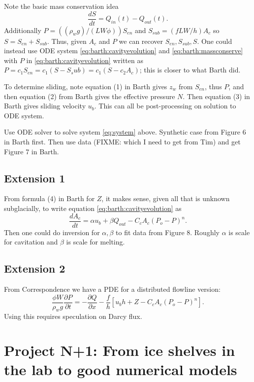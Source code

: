 \documentclass[11pt,final]{amsart}%
\begin{document}
Note the basic mass conservation idea
\begin{equation}
\frac{dS}{dt} = Q_{in}(t) - Q_{out}(t). \label{eq:barth:massconserve}
\end{equation}
Additionally $P = ((\rho_w g)/(LW\phi)) S_{en}$ and $S_{sub} = (fLW/h) A_c$ so $S = S_{en} + S_{sub}$.  Thus, given $A_c$ and $P$ we can recover $S_{en},S_{sub},S$.  One could instead use ODE system \eqref{eq:barth:cavityevolution} and \eqref{eq:barth:massconserve} with $P$ in \eqref{eq:barth:cavityevolution} written as $P= c_1 S_{en} = c_1 (S - S_sub) = c_1 (S - c_2 A_c)$; this is closer to what Barth did.

To determine sliding, note equation (1) in Barth gives $z_w$ from $S_{en}$, thus $P$, and then equation (2) from Barth gives the effective pressure $N$.  Then equation (3) in Barth gives sliding velocity $u_b$.  This can all be post-processing on solution to ODE system.

Use ODE solver to solve system \eqref{eq:system} above.  Synthetic case from Figure 6 in Barth first.  Then use data (FIXME: which I need to get from Tim) and get Figure 7 in Barth.

\subsection*{Extension 1}  From formula (4) in Barth for $Z$, it makes sense, given all that is unknown subglacially, to write equation \eqref{eq:barth:cavityevolution} as
\begin{equation*}
\frac{dA_c}{dt} = \alpha u_b + \beta Q_{out} - C_c A_c (P_o-P)^n.
\end{equation*}
Then one could do inversion for $\alpha,\beta$ to fit data from Figure 8.  Roughly $\alpha$ is scale for cavitation and $\beta$ is scale for melting.

\subsection*{Extension 2}  From Correspondence \citep{Bueler2014correspondence} we have a PDE for a distributed flowline version:
\begin{equation}
\frac{\phi W}{\rho_w g} \frac{\partial P}{\partial t} = - \frac{\partial Q}{\partial x} - \frac{f}{h} \left[u_b h + Z - C_c A_c (P_o-P)^n\right]. \label{eq:barth:distpressure}
\end{equation}
Using this requires speculation on Darcy flux.


\bigskip\bigskip
\section*{Project N+1: From ice shelves in the lab to good numerical models}
\end{document}
